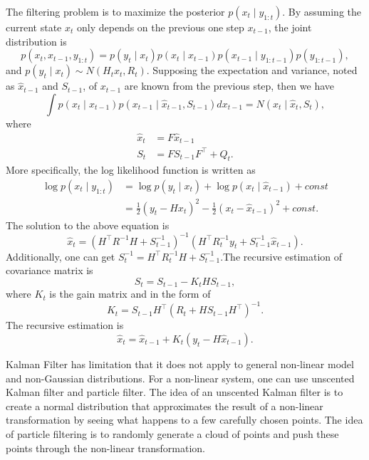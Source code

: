 The filtering problem is to maximize the posterior $p(x_t\mid y_{1:t})$. By assuming the current state $x_t$ only depends on the previous one step $x_{t-1}$, the joint distribution is 
\begin{equation*}
p(x_t,x_{t-1},y_{1:t}) = p(y_t\mid x_t)p(x_t\mid x_{t-1})p(x_{t-1}\mid y_{1:t-1})p(y_{1:t-1}),
\end{equation*}
and $p(y_t\mid x_t)\sim N(H_tx_t,R_t)$. Supposing the expectation and variance, noted as $\hat{x}_{t-1}$ and $S_{t-1}$, of $x_{t-1}$ are known from the previous step, then we have
\begin{equation*}
\int p(x_t\mid x_{t-1})p(x_{t-1}\mid \hat{x}_{t-1},S_{t-1})dx_{t-1} = N(x_t\mid \hat{x}_t,S_t),
\end{equation*}
where 
\begin{align}
\hat{x}_t &=F\hat{x}_{t-1}\\
S_t &=FS_{t-1}F^\top + Q_t.
\end{align}
More specifically, the log likelihood function is written as
\begin{align*}
\log p(x_t\mid y_{1:t}) &= \log p(y_t\mid x_t) + \log p(x_t\mid \hat{x}_{t-1}) + const\\
                          &=\frac{1}{2}(y_t-Hx_t)^2-\frac{1}{2}(x_t-\hat{x}_{t-1})^2+const.
\end{align*} 
The solution to the above equation is
\begin{equation*}
\hat{x}_t = \left(H^\top R^{-1}H+S_{t-1}^{-1}\right)^{-1}\left( H^\top R_t^{-1}y_t+S_{t-1}^{-1}\hat{x}_{t-1} \right).
\end{equation*}
Additionally, one can get $S_t^{-1} = H^\top R_t^{-1}H+S_{t-1}^{-1}$.The recursive estimation of covariance matrix is
\begin{equation}
S_t = S_{t-1} - K_t HS_{t-1},
\end{equation}
where $K_t$ is the gain matrix and in the form of
\begin{equation}
K_t = S_{t-1} H^\top (R_t +HS_{t-1}H^\top)^{-1}.
\end{equation}
The recursive estimation is 
\begin{equation}\label{estimation}
\hat{x}_t = \hat{x}_{t-1}+K_t(y_t-H\hat{x}_{t-1}).
\end{equation}

Kalman Filter has limitation that it does not apply to general non-linear model and non-Gaussian distributions.  For a non-linear system, one can use unscented Kalman filter and particle filter. The idea of an unscented Kalman filter is to create a normal distribution that approximates the result of a non-linear transformation by seeing what happens to a few carefully chosen points. The idea of particle filtering is to randomly generate a cloud of points and push these points through the non-linear transformation.






